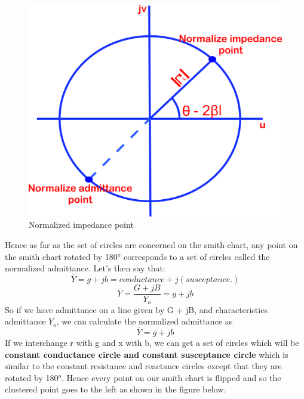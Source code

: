  \begin{figure}[h]
 \centering
 \includegraphics[width=0.6\linewidth]{./graphics/zstyuiou}
 \caption{Normalized impedance point}
 \label{fig:zstyuiou}
 \end{figure}
 
 Hence as far as the set of circles are concerned on the smith chart, any point on the smith chart rotated by 180$^o$ corresponds to a set of circles called the normalized admittance. Let's then say that:
\begin{equation*}
\overline{Y} = g + jb = conductance + j(susceptance.)
\end{equation*}
\begin{equation*}
\overline{Y}=\frac{G + jB}{Y_o} = g + jb
\end{equation*}
So if we have admittance on a line given by G + jB, and characteristics admittance $Y_o$, we can calculate the normalized admittance as 
\begin{equation*}
\overline{Y} = g + jb
\end{equation*}
If we interchange r with g and x with b, we can get a set of circles which will be \textbf{constant conductance circle and constant susceptance circle} which is similar to the constant resistance and reactance circles except that they are rotated by 180$^o$. Hence every point on our smith chart is flipped and so the clustered point goes to the left as shown in the figure below.\\

